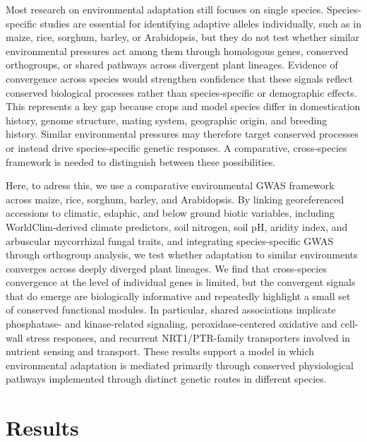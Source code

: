 \documentclass[unnumsec,webpdf,contemporary,large]{oup-authoring-template}%
\theoremstyle{thmstyleone}%
\theoremstyle{thmstyletwo}%
\theoremstyle{thmstylethree}%
\begin{document}
Most research on environmental adaptation still focuses on single species. Species-specific studies are essential for identifying adaptive alleles individually, such as in maize, rice, sorghum, barley, or Arabidopsis, but they do not test whether similar environmental pressures act among them through homologous genes, conserved orthogroups, or shared pathways across divergent plant lineages. Evidence of convergence across species would strengthen confidence that these signals reflect conserved biological processes rather than species-specific or demographic effects. This represents a key gap because crops and model species differ in domestication history, genome structure, mating system, geographic origin, and breeding history. Similar environmental pressures may therefore target conserved processes or instead drive species-specific genetic responses. A comparative, cross-species framework is needed to distinguish between these possibilities.

Here, to adress this, we use a comparative environmental GWAS framework across maize, rice, sorghum, barley, and Arabidopsis. By linking georeferenced accessions to climatic, edaphic, and below ground biotic variables, including WorldClim-derived climate predictors, soil nitrogen, soil pH, aridity index, and arbuscular mycorrhizal fungal traits, and integrating species-specific GWAS through orthogroup analysis, we test whether adaptation to similar environments converges across deeply diverged plant lineages. We find that cross-species convergence at the level of individual genes is limited, but the convergent signals that do emerge are biologically informative and repeatedly highlight a small set of conserved functional modules. In particular, shared associations implicate phosphatase- and kinase-related signaling, peroxidase-centered oxidative and cell-wall stress responses, and recurrent NRT1/PTR-family transporters involved in nutrient sensing and transport. These results support a model in which environmental adaptation is mediated primarily through conserved physiological pathways implemented through distinct genetic routes in different species.



\section{Results}
\end{document}
